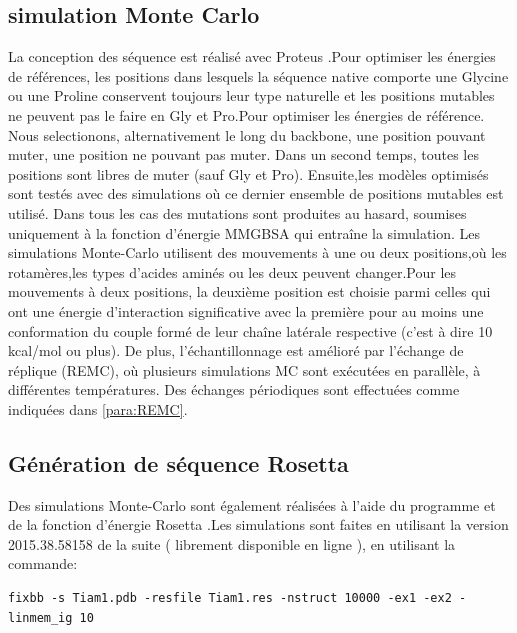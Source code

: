 \subsection{simulation Monte Carlo}    

La conception des séquence est réalisé avec Proteus \cite{Simonson13b}.Pour optimiser les énergies de références, les positions dans lesquels la séquence native comporte une Glycine ou une Proline conservent toujours leur type naturelle et les positions mutables ne peuvent pas le faire en Gly et Pro.Pour optimiser les énergies de référence. Nous selectionons, alternativement le long du backbone, une position pouvant muter, une position ne pouvant pas muter. Dans un second temps, toutes les positions sont libres de muter (sauf Gly et Pro).
Ensuite,les modèles optimisés sont testés avec des simulations où ce dernier ensemble de positions mutables est utilisé.
Dans tous les cas des mutations sont produites au hasard, soumises uniquement à la fonction d'énergie MMGBSA qui entraîne la simulation. Les simulations Monte-Carlo utilisent des mouvements à une ou deux positions,où les rotamères,les types d'acides aminés ou les deux peuvent changer.Pour les mouvements à deux positions, la deuxième position est choisie parmi celles qui ont une énergie d'interaction significative avec la première pour au moins une conformation du couple formé de leur chaîne latérale respective (c'est à dire 10 kcal/mol ou plus). De plus, l'échantillonnage est amélioré par l'échange de réplique (REMC), où plusieurs simulations MC sont exécutées en parallèle, à différentes températures. Des échanges périodiques sont effectuées comme indiquées dans \ref{para:REMC}.


\subsection{Génération de séquence Rosetta}

Des simulations Monte-Carlo sont également réalisées à l'aide du programme et de la fonction d'énergie Rosetta \cite{Baker06b}.Les simulations sont faites en utilisant la version 2015.38.58158 de la suite ( librement disponible en ligne ), en utilisant la commande:

\begin{verbatim}
fixbb -s Tiam1.pdb -resfile Tiam1.res -nstruct 10000 -ex1 -ex2 -linmem_ig 10
\end{verbatim} \normalsize


